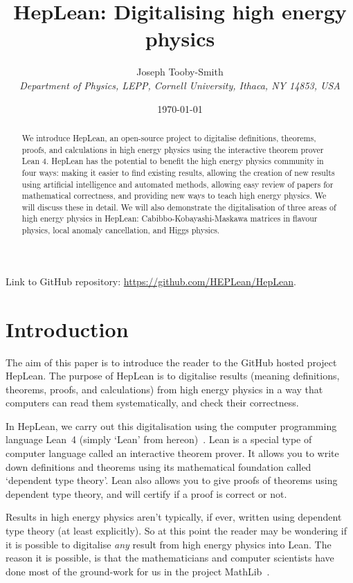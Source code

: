 \documentclass[a4paper, 11pt]{article}
\title{HepLean: Digitalising high energy physics}
\author{Joseph Tooby-Smith \\ \textit{Department of Physics, LEPP, Cornell University, Ithaca, NY 14853, USA}}
\date{\today}
\begin{document}
\maketitle 
\vspace{-1cm}
\begin{abstract}
We introduce HepLean, an open-source project to digitalise definitions, theorems, proofs, and calculations in high energy physics using the interactive theorem prover Lean 4.  HepLean has the potential to benefit the high energy physics community in four ways: making it easier to find existing results, allowing the creation of new results using artificial intelligence and automated methods, allowing easy review of papers for mathematical correctness, and providing new ways to teach high energy physics. We will discuss these in detail.
We will also demonstrate the digitalisation of three areas of high energy physics in HepLean: Cabibbo-Kobayashi-Maskawa matrices in flavour physics, local anomaly cancellation, and Higgs physics. 
\end{abstract}

\begin{center}
Link to GitHub repository: \url{https://github.com/HEPLean/HepLean}.
\end{center}	


\tableofcontents

\section{Introduction}

The aim of this paper is to introduce the reader to the GitHub hosted project  HepLean. 
The purpose of HepLean is to digitalise results (meaning definitions, theorems, proofs, and calculations) from high energy physics in a way that computers can read them systematically, and check their correctness. 

In HepLean, we carry out this digitalisation using the computer programming
language Lean~4 (simply `Lean' from hereon)~\cite{lean}. Lean is  a special type of computer language called an
interactive theorem prover. It allows you to write down definitions and theorems using its
mathematical foundation called `dependent type theory'. Lean also allows you to give proofs of
theorems using dependent type theory, and will certify if a proof is correct or not.
  
Results in high energy physics aren't typically, if ever, written using
dependent type theory (at least explicitly). So at this point the reader may be wondering if it is
possible to digitalise \emph{any} result from high energy physics into Lean. The reason it is
possible, is that the mathematicians and computer scientists have done most of the ground-work for
us in the project MathLib~\cite{mathlib}. 
\end{document}
